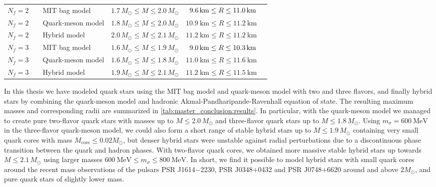 \begin{table}[b!]
{\begin{tabular}{ c l l c c c }
	$N_f=2$ & \Cref{chap:mit} & MIT bag model & $1.7 \, M_\odot \leq M \leq 2.0 \, M_\odot$ & $\hphantom{1}\SI{9.6}{\kilo\meter} \leq R \leq \SI{11.0}{\kilo\meter}$ \\
	$N_f=2$ & \Cref{chap:lsm2f} & Quark-meson model & $1.8 \, M_\odot \leq M \leq 2.0 \, M_\odot$ & $\SI{10.9}{\kilo\meter} \leq R \leq \SI{11.2}{\kilo\meter}$ \\
	$N_f=2$ & \Cref{chap:hybrid} & Hybrid model & $2.0 \, M_\odot \leq M \leq 2.1 \, M_\odot$ & $\SI{11.2}{\kilo\meter} \leq R \leq \SI{11.2}{\kilo\meter}$ \\
	\midrule
	$N_f=3$ & \Cref{chap:mit} & MIT bag model & $1.6 \, M_\odot \leq M \leq 1.9 \, M_\odot$ & $\hphantom{1}\SI{9.0}{\kilo\meter} \leq R \leq \SI{10.3}{\kilo\meter}$ \\
	$N_f=3$ & \Cref{chap:lsm3f} & Quark-meson model & $1.6 \, M_\odot \leq M \leq 1.8 \, M_\odot$ & $\SI{11.0}{\kilo\meter} \leq R \leq \SI{11.6}{\kilo\meter}$ \\
	$N_f=3$ & \Cref{chap:hybrid} & Hybrid model & $1.9 \, M_\odot \leq M \leq 2.1 \, M_\odot$ & $\SI{11.2}{\kilo\meter} \leq R \leq \SI{11.5}{\kilo\meter}$ \\
	\bottomrule
\end{tabular}}
\end{table}

In this thesis we have modeled quark stars using the MIT bag model and quark-meson model with two and three flavors,
and finally hybrid stars by combining the quark-meson model and hadronic Akmal-Pandharipande-Ravenhall equation of state.
The resulting maximum masses and corresponding radii are summarized in \cref{tab:master_conclusion:results}.
In particular, with the quark-meson model we managed to create pure two-flavor quark stars with masses up to $M \leq 2.0 \, M_\odot$ and three-flavor quark stars up to $M \leq 1.8 \, M_\odot$.
Using $m_\sigma = \SI{600}{\mega\electronvolt}$ in the three-flavor quark-meson model,
we could also form a short range of stable hybrid stars up to $M \leq 1.9 \, M_\odot$ containing very small quark cores with mass $M_\text{core} \leq 0.02 M_\odot$,
but denser hybrid stars were unstable against radial perturbations due to a discontinuous phase transition between the quark and hadron phases.
With two-flavor quark cores,
we obtained more massive stable hybrid stars up towards $M \leq 2.1 \, M_\odot$ using larger masses $\SI{600}{\mega\electronvolt} \leq m_\sigma \leq \SI{800}{\mega\electronvolt}$.
In short, we find it possible to model hybrid stars with small quark cores around the recent mass observations of the pulsars PSR J1614$-$2230, PSR J0348$+$0432 and PSR J0748$+$6620 around and above $2 M_\odot$,
and pure quark stars of slightly lower mass.

